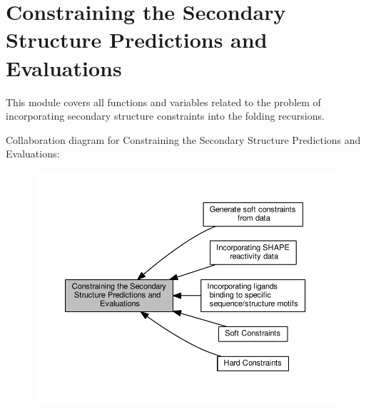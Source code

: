 \hypertarget{group__constraints}{}\section{Constraining the Secondary Structure Predictions and Evaluations}
\label{group__constraints}


This module covers all functions and variables related to the problem of incorporating secondary structure constraints into the folding recursions.  


Collaboration diagram for Constraining the Secondary Structure Predictions and Evaluations\+:
\nopagebreak
\begin{figure}[H]
\begin{center}
\leavevmode
\includegraphics[width=350pt]{group__constraints}
\end{center}
\end{figure}
